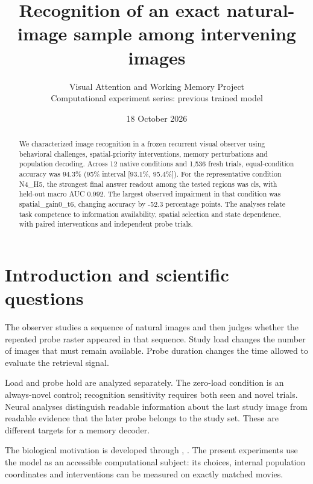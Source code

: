 \documentclass[11pt]{article}
\begin{document}
\title{\color{ink}Recognition of an exact natural-image sample among intervening images}
\author{Visual Attention and Working Memory Project\\Computational experiment series: previous trained model}\date{18 October 2026}\maketitle
\begin{abstract}
We characterized image recognition in a frozen recurrent visual observer using behavioral challenges, spatial-priority interventions, memory perturbations and population decoding. Across 12 native conditions and 1,536 fresh trials, equal-condition accuracy was 94.3\% (95\% interval [93.1\%, 95.4\%]). For the representative condition N4\_\allowbreak{}H5, the strongest final answer readout among the tested regions was cls, with held-out macro AUC 0.992. The largest observed impairment in that condition was spatial\_\allowbreak{}gain0\_\allowbreak{}t6, changing accuracy by -52.3 percentage points. The analyses relate task competence to information availability, spatial selection and state dependence, with paired interventions and independent probe trials.
\end{abstract}
\section{Introduction and scientific questions}
The observer studies a sequence of natural images and then judges whether the repeated probe raster appeared in that sequence. Study load changes the number of images that must remain available. Probe duration changes the time allowed to evaluate the retrieval signal.

Load and probe hold are analyzed separately. The zero-load condition is an always-novel control; recognition sensitivity requires both seen and novel trials. Neural analyses distinguish readable information about the last study image from readable evidence that the later probe belongs to the study set. These are different targets for a memory decoder.

The biological motivation is developed through \cite{wm}, \cite{it}. The present experiments use the model as an accessible computational subject: its choices, internal population coordinates and interventions can be measured on exactly matched movies.
\end{document}
